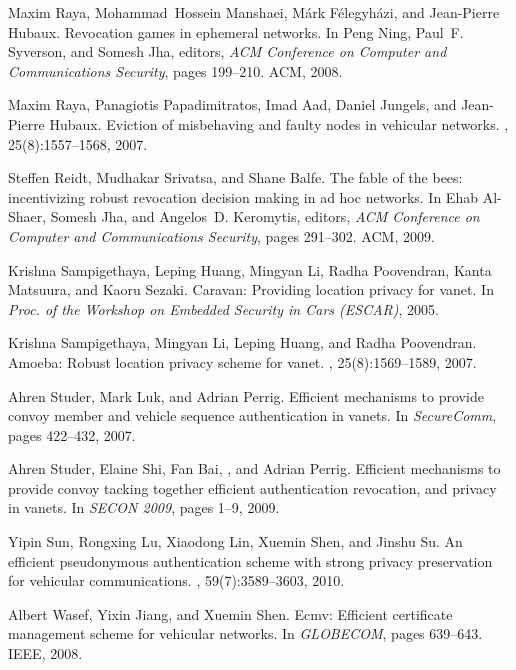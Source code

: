 \documentclass[conference]{IEEEtran}[10pt]
\begin{document}
\begin{thebibliography}{10}
Maxim Raya, Mohammad~Hossein Manshaei, M{\'a}rk F{\'e}legyh{\'a}zi, and
  Jean-Pierre Hubaux.
\newblock Revocation games in ephemeral networks.
\newblock In Peng Ning, Paul~F. Syverson, and Somesh Jha, editors, {\em ACM
  Conference on Computer and Communications Security}, pages 199--210. ACM,
  2008.

Maxim Raya, Panagiotis Papadimitratos, Imad Aad, Daniel Jungels, and
  Jean-Pierre Hubaux.
\newblock Eviction of misbehaving and faulty nodes in vehicular networks.
,
  25(8):1557--1568, 2007.

Steffen Reidt, Mudhakar Srivatsa, and Shane Balfe.
\newblock The fable of the bees: incentivizing robust revocation decision
  making in ad hoc networks.
\newblock In Ehab Al-Shaer, Somesh Jha, and Angelos~D. Keromytis, editors, {\em
  ACM Conference on Computer and Communications Security}, pages 291--302. ACM,
  2009.

Krishna Sampigethaya, Leping Huang, Mingyan Li, Radha Poovendran, Kanta
  Matsuura, and Kaoru Sezaki.
\newblock Caravan: Providing location privacy for vanet.
\newblock In {\em Proc. of the Workshop on Embedded Security in Cars (ESCAR)},
  2005.

Krishna Sampigethaya, Mingyan Li, Leping Huang, and Radha Poovendran.
\newblock Amoeba: Robust location privacy scheme for vanet.
,
  25(8):1569--1589, 2007.

Ahren Studer, Mark Luk, and Adrian Perrig.
\newblock Efficient mechanisms to provide convoy member and vehicle sequence
  authentication in vanets.
\newblock In {\em SecureComm}, pages 422--432, 2007.

Ahren Studer, Elaine Shi, Fan Bai, , and Adrian Perrig.
\newblock Efficient mechanisms to provide convoy tacking together efficient
  authentication revocation, and privacy in vanets.
\newblock In {\em SECON 2009}, pages 1--9, 2009.

Yipin Sun, Rongxing Lu, Xiaodong Lin, Xuemin Shen, and Jinshu Su.
\newblock An efficient pseudonymous authentication scheme with strong privacy
  preservation for vehicular communications.
, 59(7):3589--3603, 2010.

Albert Wasef, Yixin Jiang, and Xuemin Shen.
\newblock Ecmv: Efficient certificate management scheme for vehicular networks.
\newblock In {\em GLOBECOM}, pages 639--643. IEEE, 2008.


\end{thebibliography}
\end{document}
